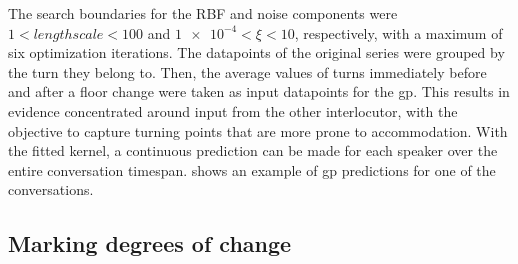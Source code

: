 The search boundaries for the RBF and noise components were $1 < lengthscale < 100$ and $\num{1e-4} < \xi < 10$, respectively, with a maximum of six optimization iterations.
The datapoints of the original series were grouped by the turn they belong to.
Then, the average values of turns immediately before and after a floor change were taken as input datapoints for the \ac{gp}.
This results in evidence concentrated around input from the other interlocutor, with the objective to capture turning points that are more prone to accommodation.
With the fitted kernel, a continuous prediction can be made for each speaker over the entire conversation timespan.
 shows an example of \ac{gp} predictions for one of the conversations.

\subsection{Marking degrees of change}
\label{subsec:measuring_changes}

